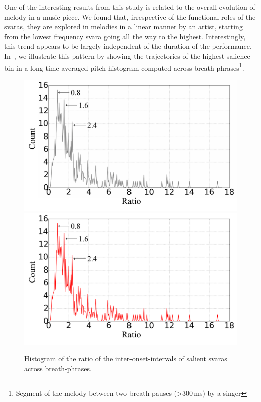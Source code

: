 One of the interesting results from this study is related to the overall evolution of melody in a music piece. We found that, irrespective of the functional roles of the \glspl{svara}, they are explored in melodies in a linear manner by an artist, starting from the lowest frequency \gls{svara} going all the way to the highest. Interestingly, this trend appears to be largely independent of the duration of the performance. In~, we illustrate this pattern by showing the trajectories of the highest salience bin in a long-time averaged pitch histogram computed across breath-phrases\footnote{Segment of the melody between two breath pauses (>300\,ms) by a singer}. 

\begin{figure}
	\begin{center}
		\ifdefined\PRINTVER
			\includegraphics[width=\figSizeSeventy]{ch08_applications/figures/Fig-8_BW.pdf}
		\else
			\includegraphics[width=\figSizeSeventy]{ch08_applications/figures/Fig-8.pdf}
		\fi
	\end{center}
	\caption{Histogram of the ratio of the inter-onset-intervals of salient \glspl{svara} across breath-phrases.}
	\label{fig:pulsation_example}
\end{figure}


